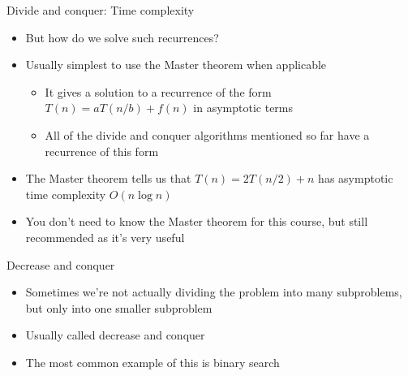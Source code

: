 \documentclass[12pt,t]{beamer}
\newcommand{\bi}{\begin{itemize}}
\newcommand{\ei}{\end{itemize}}
\begin{document}
\begin{frame}[fragile]{Divide and conquer: Time complexity}
    \bi
        \item But how do we solve such recurrences?
        \item Usually simplest to use the Master theorem when applicable
            \bi
                \item It gives a solution to a recurrence of the form $T(n) = aT(n/b) + f(n)$ in asymptotic terms
                \item All of the divide and conquer algorithms mentioned so far have a recurrence of this form
            \ei
        \vspace{10pt}
        \item The Master theorem tells us that $T(n) = 2T(n/2) + n$ has asymptotic time complexity $O(n \log n)$
        \vspace{10pt}
        \item You don't need to know the Master theorem for this course, but still recommended as it's very useful
    \ei
\end{frame}

\begin{frame}{Decrease and conquer}
    \vspace{30pt}
    \bi
        \item Sometimes we're not actually dividing the problem into many subproblems, but only into one smaller subproblem
        \item Usually called decrease and conquer
        \item The most common example of this is binary search
    \ei
\end{frame}
\end{document}
